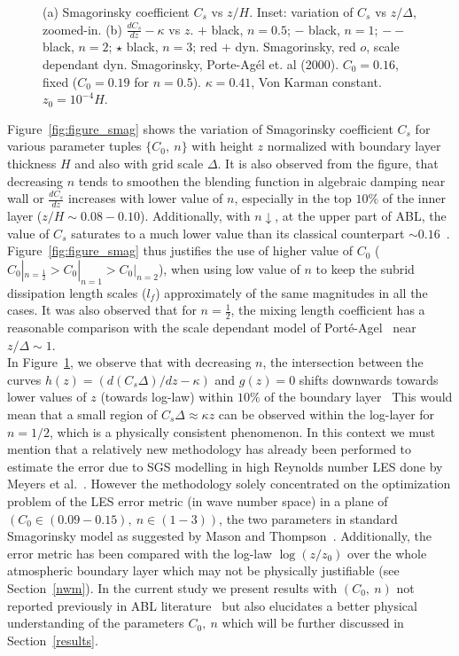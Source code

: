 \begin{figure}
\begin{subfigure}[t]{0.5\textwidth}
                \caption{}
                \label{fig:smagd}
        \end{subfigure}
       \caption[Smagorinsky coefficient $C_s$ vs $z/H$ for different $(C_0, \ n)$]{(a) Smagorinsky coefficient $C_s$ vs $z/H$. Inset: variation of $C_s$ vs $z/\Delta$, zoomed-in. (b) $\frac{dC_s}{dz}-\kappa$ vs $z$.   $+$ black, $n = 0.5$; $-$ black, $n = 1$; $--$ black, $n = 2$; $\star$ black, $n = 3$; red $+$ dyn. Smagorinsky, red $o$, scale dependant dyn. Smagorinsky, Porte-Ag\'{e}l et. al (2000). $C_0 = 0.16$, fixed ($C_0 = 0.19$ for $n = 0.5$). $\kappa = 0.41$, Von Karman constant. $z_0 = 10^{-4}H$.}
\label{fig:smag}
\end{figure}

Figure~\ref{fig:figure_smag} shows the variation of Smagorinsky coefficient $C_s$ for various parameter tuples $\lbrace C_0, \ n \rbrace$ with height $z$ normalized with boundary layer thickness $H$ and also with grid scale $\Delta$. It is also observed from the  figure, that decreasing $n$ tends to smoothen the blending function in algebraic damping near wall or $\frac{dC_s}{dz}$ increases with lower value of $n$, especially in the top $10\%$ of the inner layer ($z/H \sim 0.08 - 0.10$). Additionally, with $n \downarrow$, at the upper part of ABL, the value of $C_s$ saturates to a much lower value than its classical counterpart $\sim 0.16$~\cite{lily0}.  Figure~\ref{fig:figure_smag} thus justifies the use of higher value of $C_0$ ($C_0|_{n=\frac{1}{2}} > C_0|_{n=1} > C_0|_{n=2}$), when using low value of $n$ to keep the subrid dissipation length scales ($l_f$) approximately of the same magnitudes in all the cases. It was also observed that for $n = \frac{1}{2}$, the mixing length coefficient has a reasonable comparison with the scale dependant model of Port\'{e}-Agel~\cite{porte1fun} near $z/\Delta \sim 1$.\\

In Figure~\ref{fig:smagd}, we observe that with decreasing $n$, the intersection between the curves $h(z) = (d(C_s\Delta)/dz - \kappa)$ and $g(z) = 0$ shifts downwards towards lower values of $z$ (towards log-law) within $10\%$ of the boundary layer~\cite{porte1fun,brass,meyers2} This would mean that a small region of $C_s\Delta \approx \kappa z$ can be observed within the log-layer for $n = 1/2$, which is a physically consistent phenomenon.
In this context we must mention that a relatively new methodology has already been performed to estimate the error due to SGS modelling in high Reynolds number LES done by Meyers et al.~\cite{meyers_err}. However the methodology solely concentrated on the optimization problem of the LES error metric (in wave number space) in a plane of $(C_0 \in (0.09-0.15), \ n \in(1-3))$, the two parameters in standard Smagorinsky model as suggested by Mason and Thompson~\cite{mason}. Additionally, the error metric has been compared with the log-law $\log(z/z_0)$ over the whole atmospheric boundary layer which may not be physically justifiable (see Section~\ref{nwm}). In the current study we present results with $(C_0, \ n)$ not reported previously in ABL literature~\cite{porte1fun,meyers_err,meyers2} but also elucidates a better physical understanding of the parameters $C_0, \ n$ which will be further discussed in Section~\ref{results}.
